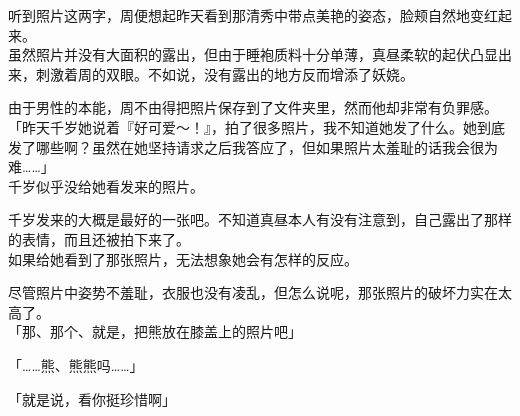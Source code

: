 听到照片这两字，周便想起昨天看到那清秀中带点美艳的姿态，脸颊自然地变红起来。\\

虽然照片并没有大面积的露出，但由于睡袍质料十分单薄，真昼柔软的起伏凸显出来，刺激着周的双眼。不如说，没有露出的地方反而增添了妖娆。

由于男性的本能，周不由得把照片保存到了文件夹里，然而他却非常有负罪感。\\

「昨天千岁她说着『好可爱～！』，拍了很多照片，我不知道她发了什么。她到底发了哪些啊？虽然在她坚持请求之后我答应了，但如果照片太羞耻的话我会很为难……」\\

千岁似乎没给她看发来的照片。

千岁发来的大概是最好的一张吧。不知道真昼本人有没有注意到，自己露出了那样的表情，而且还被拍下来了。\\

如果给她看到了那张照片，无法想象她会有怎样的反应。

尽管照片中姿势不羞耻，衣服也没有凌乱，但怎么说呢，那张照片的破坏力实在太高了。\\

「那、那个、就是，把熊放在膝盖上的照片吧」

「……熊、熊熊吗……」

「就是说，看你挺珍惜啊」\\

